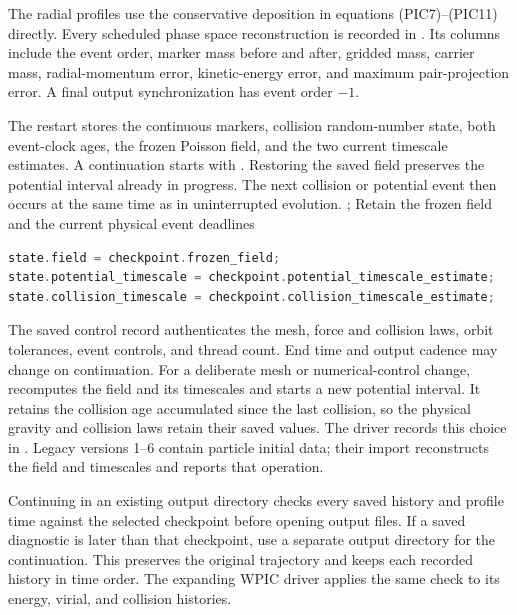 The radial profiles use the conservative deposition in equations
(PIC7)--(PIC11) directly.  Every scheduled phase space reconstruction is
recorded in
.  Its columns include the event order, marker
mass before and after, gridded mass, carrier mass, radial-momentum error,
kinetic-energy error, and maximum pair-projection error.  A final output
synchronization has event order \(-1\).

The restart stores the continuous markers, collision random-number state,
both event-clock ages, the frozen Poisson field, and the two current timescale
estimates. A continuation starts with . Restoring the
saved field preserves the potential interval already in progress. The next
collision or potential event then occurs at the same time as in uninterrupted
evolution.
{;
 }
{Retain the frozen field and the current physical event deadlines}
\begin{lstlisting}[language=C++]
state.field = checkpoint.frozen_field;
state.potential_timescale = checkpoint.potential_timescale_estimate;
state.collision_timescale = checkpoint.collision_timescale_estimate;
\end{lstlisting}
The saved control record authenticates the mesh, force and collision laws,
orbit tolerances, event controls, and thread count. End time and output
cadence may change on continuation. For a deliberate mesh or numerical-control change,
 recomputes the field and its timescales and
starts a new potential interval. It retains the collision age accumulated
since the last collision, so the physical gravity and collision laws retain
their saved values. The driver records this choice in
. Legacy versions 1--6 contain particle initial data;
their import reconstructs the field and timescales and reports that operation.

Continuing in an existing output directory checks every saved history and
profile time against the selected checkpoint before opening output files.
If a saved diagnostic is later than that checkpoint, use a separate output
directory for the continuation. This preserves the original trajectory and
keeps each recorded history in time order. The expanding WPIC driver applies
the same check to its energy, virial, and collision histories.

